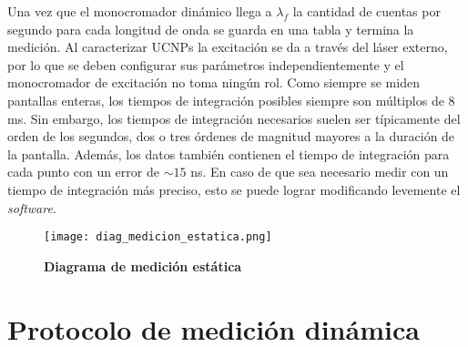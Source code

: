 \noindent Una vez que el monocromador dinámico llega a $\lambda_f$ la cantidad de cuentas por segundo para cada longitud de onda se guarda en una tabla y termina la medición.
Al caracterizar UCNPs la excitación se da a través del láser externo, por lo que se deben configurar sus parámetros independientemente y el monocromador de excitación no toma ningún rol.
Como siempre se miden pantallas enteras, los tiempos de integración posibles siempre son múltiplos de 8 ms.
Sin embargo, los tiempos de integración necesarios suelen ser típicamente del orden de los segundos, dos o tres órdenes de magnitud mayores a la duración de la pantalla.
Además, los datos también contienen el tiempo de integración para cada punto con un error de $\sim 15$ ns.
En caso de que sea necesario medir con un tiempo de integración más preciso, esto se puede lograr modificando levemente el \textit{software}.

\begin{SCfigure}
     \centering
     \texttt{[image: diag\_medicion\_estatica.png]}
     \caption{\textbf{Diagrama de medición estática}}
     \label{fig:diag_medicion_estatica}
\end{SCfigure}

\section{Protocolo de medición dinámica} \label{sec:proceso_dinamico}

